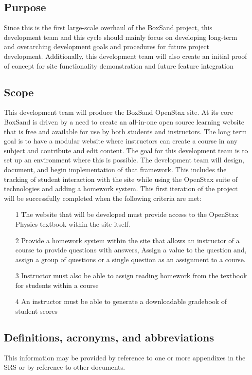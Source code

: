 \documentclass[onecolumn, draftclsnofoot,10pt, compsoc]{IEEEtran}
\begin{document}
\subsection{Purpose}
Since this is the first large-scale overhaul of the BoxSand project, this development team and this cycle should mainly focus on developing long-term and overarching development goals and procedures for future project development. Additionally, this development team will also create an initial proof of concept for site functionality demonstration and future feature integration


\subsection{Scope}
This development team will produce the BoxSand OpenStax site. At its core BoxSand is driven by a need to create an all-in-one open source learning website that is free and available for use by both students and instructors. The long term goal is to have a modular website where instructors can create a course in any subject and contribute and edit content. The goal for this development team is to set up an environment where this is possible. The development team will design, document, and begin implementation of that framework. This includes the tracking of student interaction with the site while using the OpenStax suite of technologies and adding a homework system. This first iteration of the project will be successfully completed when the following criteria are met:

\begin{enumerate}
\item[1] The website that will be developed must provide access to the OpenStax Physics textbook within the site itself. 
\item[2] Provide a homework system within the site that allows an instructor of a course to provide questions with answers, Assign a value to the question and, assign a group of questions or a single question as an assignment to a course.
\item[3] Instructor must also be able to assign reading homework from the textbook for students within a course
\item[4] An instructor must be able to generate a downloadable gradebook of student scores
\end{enumerate}

\subsection{Definitions, acronyms, and abbreviations}
This information may be provided by reference to one or more appendixes in the SRS or
by reference to other documents.
\end{document}
